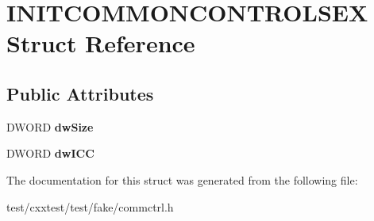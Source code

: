 \hypertarget{structINITCOMMONCONTROLSEX}{\section{I\-N\-I\-T\-C\-O\-M\-M\-O\-N\-C\-O\-N\-T\-R\-O\-L\-S\-E\-X Struct Reference}
\label{structINITCOMMONCONTROLSEX}
}
\subsection*{Public Attributes}
\begin{DoxyCompactItemize}
\item 
\hypertarget{structINITCOMMONCONTROLSEX_a9e21f312181731f291c2564c0849b5a2}{D\-W\-O\-R\-D {\bfseries dw\-Size}}\label{structINITCOMMONCONTROLSEX_a9e21f312181731f291c2564c0849b5a2}

\item 
\hypertarget{structINITCOMMONCONTROLSEX_ac53be0ca7f0374ad2a2e1b45da8ff7ce}{D\-W\-O\-R\-D {\bfseries dw\-I\-C\-C}}\label{structINITCOMMONCONTROLSEX_ac53be0ca7f0374ad2a2e1b45da8ff7ce}

\end{DoxyCompactItemize}


The documentation for this struct was generated from the following file\-:\begin{DoxyCompactItemize}
\item 
test/cxxtest/test/fake/commctrl.\-h\end{DoxyCompactItemize}
